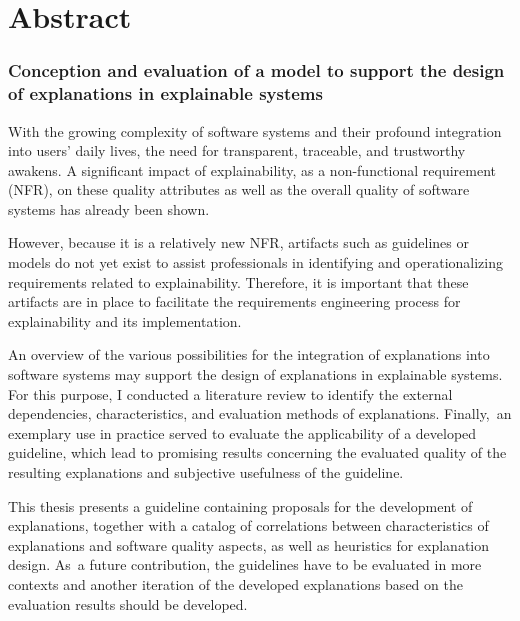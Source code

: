 \clearpage

\chapter*{Abstract}

\subsection*{Conception and evaluation of a model to support the design of explanations in explainable systems}

With the growing complexity of software systems and their profound integration into users' daily lives, the need for transparent, traceable, and trustworthy awakens. A significant impact of explainability, as a non-functional requirement (NFR), on these quality attributes as well as the overall quality of software systems has already been shown.

However, because it is a relatively new NFR, artifacts such as guidelines or models do not yet exist to assist professionals in identifying and operationalizing requirements related to explainability. Therefore, it is important that these artifacts are in place to facilitate the requirements engineering process for explainability and its implementation.

An overview of the various possibilities for the integration of explanations into software systems may support the design of explanations in explainable systems. For this purpose, I conducted a literature review to identify the external dependencies, characteristics, and evaluation methods of explanations. Finally, an exemplary use in practice served to evaluate the applicability of a developed guideline, which lead to promising results concerning the evaluated quality of the resulting explanations and subjective usefulness of the guideline. 

This thesis presents a guideline containing proposals for the development of explanations, together with a catalog of correlations between characteristics of explanations and software quality aspects, as well as heuristics for explanation design. As a future contribution, the guidelines have to be evaluated in more contexts and another iteration of the developed explanations based on the evaluation results should be developed.

\clearpage